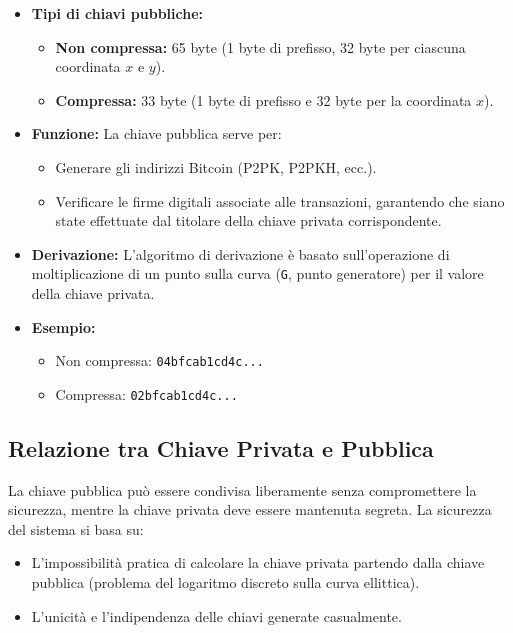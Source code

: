 \documentclass{article}
\begin{document}
\begin{itemize}
    \item \textbf{Tipi di chiavi pubbliche:}
    \begin{itemize}
        \item \textbf{Non compressa:} 65 byte (1 byte di prefisso, 32 byte per ciascuna coordinata $x$ e $y$).
        \item \textbf{Compressa:} 33 byte (1 byte di prefisso e 32 byte per la coordinata $x$).
    \end{itemize}
    \item \textbf{Funzione:} La chiave pubblica serve per:
    \begin{itemize}
        \item Generare gli indirizzi Bitcoin (P2PK, P2PKH, ecc.).
        \item Verificare le firme digitali associate alle transazioni, garantendo che siano state effettuate dal titolare della chiave privata corrispondente.
    \end{itemize}
    \item \textbf{Derivazione:} L'algoritmo di derivazione è basato sull'operazione di moltiplicazione di un punto sulla curva (\texttt{G}, punto generatore) per il valore della chiave privata.
    \item \textbf{Esempio:}
    \begin{itemize}
        \item Non compressa: \texttt{04bfcab1cd4c...}
        \item Compressa: \texttt{02bfcab1cd4c...}
    \end{itemize}
\end{itemize}

\subsection{Relazione tra Chiave Privata e Pubblica}
La chiave pubblica può essere condivisa liberamente senza compromettere la sicurezza, mentre la chiave privata deve essere mantenuta segreta. La sicurezza del sistema si basa su:
\begin{itemize}
    \item L'impossibilità pratica di calcolare la chiave privata partendo dalla chiave pubblica (problema del logaritmo discreto sulla curva ellittica).
    \item L'unicità e l'indipendenza delle chiavi generate casualmente.
\end{itemize}
\end{document}
